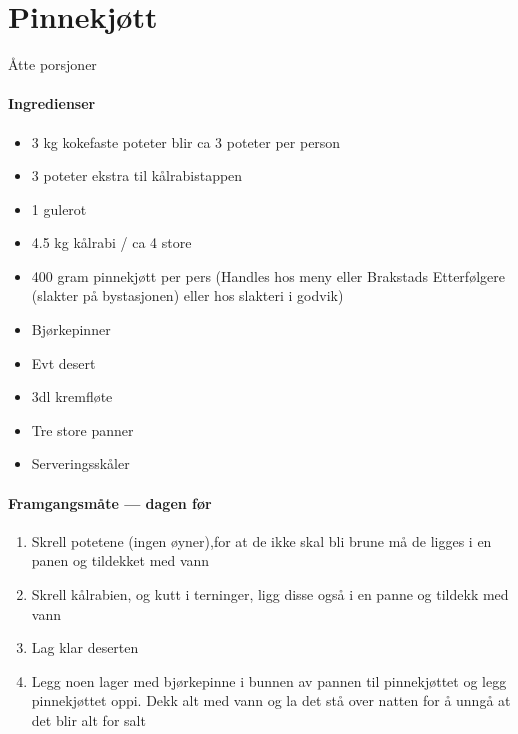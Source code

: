 \section{Pinnekjøtt}
Åtte porsjoner

\paragraph{Ingredienser}
\begin{itemize}[noitemsep]
  \item 3 kg kokefaste poteter blir ca 3 poteter per person
  \item 3 poteter ekstra til kålrabistappen
  \item 1 gulerot
  \item 4.5 kg kålrabi / ca 4 store
  \item 400 gram pinnekjøtt per pers (Handles hos meny eller Brakstads Etterfølgere (slakter på bystasjonen) eller hos slakteri i godvik)
  \item Bjørkepinner
  \item Evt desert
  \item 3dl kremfløte
  \item Tre store panner
  \item Serveringsskåler
\end{itemize}

\paragraph{Framgangsmåte --- dagen før}
\begin{enumerate}[noitemsep]
  \item Skrell potetene (ingen øyner),for at de ikke skal bli brune må de ligges i en panen og tildekket med vann
  \item Skrell kålrabien, og kutt i terninger, ligg disse også i en panne og tildekk med vann
  \item Lag klar deserten
  \item Legg noen lager med bjørkepinne i bunnen av pannen til pinnekjøttet og legg pinnekjøttet oppi. Dekk alt med vann og la det stå over natten for å unngå at det blir alt for salt
\end{enumerate}

